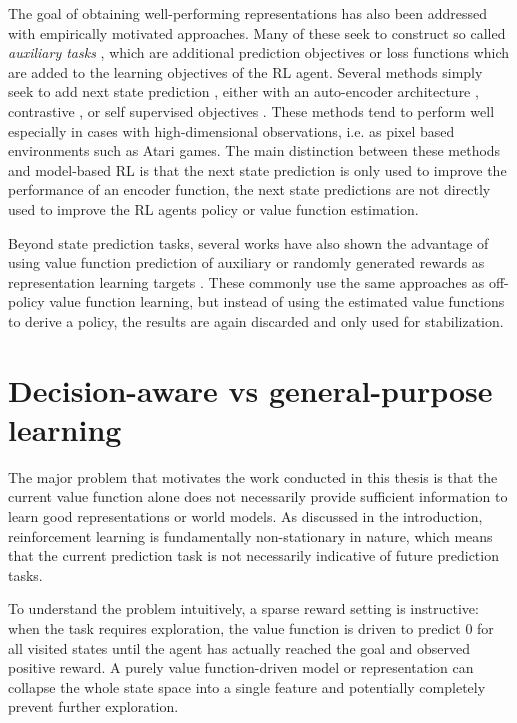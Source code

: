The goal of obtaining well-performing representations has also been addressed with empirically motivated approaches.
Many of these seek to construct so called \emph{auxiliary tasks} \parencite{jaderberg2017reinforcement}, which are additional prediction objectives or loss functions which are added to the learning objectives of the RL agent.
Several methods simply seek to add next state prediction , either with an auto-encoder architecture \parencite{jaderberg2017reinforcement}, contrastive \parencite{laskin2020contrastive}, or self supervised objectives \parencite{gelada2019deepmdp,schwarzer2021dataefficient,schwarzer2021pretraining,tang2022understanding}.
These methods tend to perform well especially in cases with high-dimensional observations, i.e. as pixel based environments such as Atari games.
The main distinction between these methods and model-based RL is that the next state prediction is only used to improve the performance of an encoder function, the next state predictions are not directly used to improve the RL agents policy or value function estimation.

Beyond state prediction tasks, several works have also shown the advantage of using value function prediction of auxiliary or randomly generated rewards as representation learning targets \parencite{lyle2021effect,farebrother2023protovalue}.
These commonly use the same approaches as off-policy value function learning, but instead of using the estimated value functions to derive a policy, the results are again discarded and only used for stabilization.

\section{Decision-aware vs general-purpose learning}

The major problem that motivates the work conducted in this thesis is that the current value function alone does not necessarily provide sufficient information to learn good representations or world models.
As discussed in the introduction, reinforcement learning is fundamentally non-stationary in nature, which means that the current prediction task is not necessarily indicative of future prediction tasks.

To understand the problem intuitively, a sparse reward setting is instructive: when the task requires exploration, the value function is driven to predict $0$ for all visited states until the agent has actually reached the goal and observed positive reward.
A purely value function-driven model or representation can collapse the whole state space into a single feature and potentially completely prevent further exploration.


